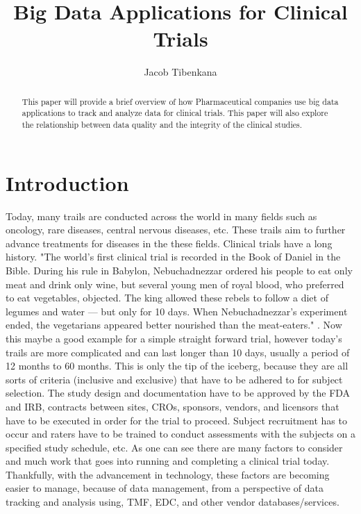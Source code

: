 \documentclass[sigconf]{acmart}
\begin{document}
\title{Big Data Applications for Clinical Trials}


\author{Jacob Tibenkana}

\renewcommand{\shortauthors}{J. Tibenkana}


\begin{abstract}
This  paper will  provide a brief overview  of how Pharmaceutical companies use big data applications to track and analyze data 
for clinical trials. 
This paper will also explore the relationship between data quality and the integrity of the clinical studies. 
\end{abstract}



\maketitle

\section{Introduction}
Today, many trails are conducted across the world in many fields such as oncology, rare diseases, central nervous diseases, etc. 
These trails aim to further advance treatments for diseases in the these fields. 
Clinical trials have a long history. "The world's first clinical trial is recorded in the Book of Daniel in the Bible. During his rule in Babylon, Nebuchadnezzar ordered his people to eat only meat and drink only wine, but several young men of royal blood, who preferred to eat vegetables, objected. The king allowed these rebels to follow a diet of legumes and water — but only for 10 days. When Nebuchadnezzar's experiment ended, the vegetarians appeared better nourished than the meat-eaters." \cite{Bhatt10}. 
Now this maybe a good example for a simple straight forward trial, however today's trails are more complicated and can last longer than 10 days, usually a period of 12 months to 60 months. 
This is only the tip of the iceberg, because they are all sorts of criteria (inclusive and exclusive) that have to be adhered to for subject selection. The study design and documentation have to be approved by the FDA and IRB, contracts between sites, CROs, sponsors, vendors, and licensors that have to be executed in order for the trial to proceed. 
Subject recruitment has to occur and raters have to be trained to conduct assessments with the subjects on a specified study schedule, etc. As one can see there are many factors to consider and much work that goes into running and completing a clinical trial today. Thankfully, with the advancement in technology, these factors are becoming easier to manage, because of data management, from a perspective of data tracking and analysis using, TMF, EDC, and other vendor databases/services.
\end{document}
